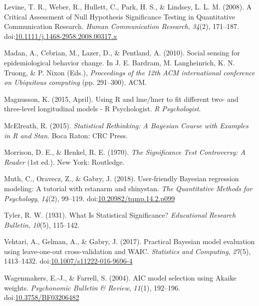 \documentclass[doc]{apa6}
\begin{document}
\hypertarget{ref-LevineCriticalAssessmentNull2008}{}
Levine, T. R., Weber, R., Hullett, C., Park, H. S., \& Lindsey, L. L. M.
(2008). A Critical Assessment of Null Hypothesis Significance Testing in
Quantitative Communication Research. \emph{Human Communication
Research}, \emph{34}(2), 171--187.
doi:\href{https://doi.org/10.1111/j.1468-2958.2008.00317.x}{10.1111/j.1468-2958.2008.00317.x}

\hypertarget{ref-MadanSocialsensingepidemiological2010}{}
Madan, A., Cebrian, M., Lazer, D., \& Pentland, A. (2010). Social
sensing for epidemiological behavior change. In J. E. Bardram, M.
Langheinrich, K. N. Truong, \& P. Nixon (Eds.), \emph{Proceedings of the
12th ACM international conference on Ubiquitous computing} (pp.
291--300). ACM.

\hypertarget{ref-magnussonUsingLmeLmer2015}{}
Magnusson, K. (2015, April). Using R and lme/lmer to fit different two-
and three-level longitudinal models - R Psychologist. \emph{R
Psychologist}.

\hypertarget{ref-McElreathStatisticalRethinkingBayesian2015}{}
McElreath, R. (2015). \emph{Statistical Rethinking: A Bayesian Course
with Examples in R and Stan}. Boca Raton: CRC Press.

\hypertarget{ref-morrisonSignificanceTestControversy1970}{}
Morrison, D. E., \& Henkel, R. E. (1970). \emph{The Significance Test
Controversy: A Reader} (1st ed.). New York: Routledge.

\hypertarget{ref-TQMP14-2-99}{}
Muth, C., Oravecz, Z., \& Gabry, J. (2018). User-friendly Bayesian
regression modeling: A tutorial with rstanarm and shinystan. \emph{The
Quantitative Methods for Psychology}, \emph{14}(2), 99--119.
doi:\href{https://doi.org/10.20982/tqmp.14.2.p099}{10.20982/tqmp.14.2.p099}

\hypertarget{ref-tylerWhatStatisticalSignificance1931}{}
Tyler, R. W. (1931). What Is Statistical Significance? \emph{Educational
Research Bulletin}, \emph{10}(5), 115--142.

\hypertarget{ref-Vehtari2017}{}
Vehtari, A., Gelman, A., \& Gabry, J. (2017). Practical Bayesian model
evaluation using leave-one-out cross-validation and WAIC.
\emph{Statistics and Computing}, \emph{27}(5), 1413--1432.
doi:\href{https://doi.org/10.1007/s11222-016-9696-4}{10.1007/s11222-016-9696-4}

\hypertarget{ref-WagenmakersAICmodelselection2004}{}
Wagenmakers, E.-J., \& Farrell, S. (2004). AIC model selection using
Akaike weights. \emph{Psychonomic Bulletin \& Review}, \emph{11}(1),
192--196.
doi:\href{https://doi.org/10.3758/BF03206482}{10.3758/BF03206482}
\end{document}
